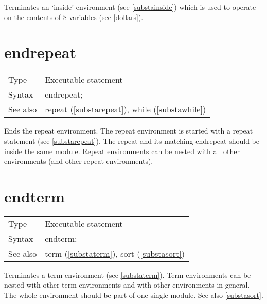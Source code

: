 \noindent Terminates an `inside' 
environment (see \ref{substainside}) which is 
used to operate on the contents of \$-variables (see 
\ref{dollars}).\vspace{10mm}


\section{endrepeat}
\label{substaendrepeat}

\noindent \begin{tabular}{ll}
Type & Executable statement\\
Syntax & endrepeat;
\\ See also & repeat (\ref{substarepeat}), while (\ref{substawhile})
\end{tabular} \vspace{4mm}

\noindent Ends the repeat 
environment. The repeat environment is started 
with a repeat statement (see \ref{substarepeat}). The repeat and its 
matching endrepeat should be inside the same module. 
Repeat environments can be nested with all other environments (and other 
repeat environments). \vspace{10mm}


\section{endterm}
\label{substaendterm}

\noindent \begin{tabular}{ll}
Type & Executable statement\\
Syntax & endterm;
\\ See also & term (\ref{substaterm}), sort (\ref{substasort})
\end{tabular} \vspace{4mm}

\noindent Terminates a term environment 
(see \ref{substaterm}). Term environments can be nested with 
other term environments and with other environments in general. The whole 
environment should be part of one single module. See also \ref{substasort}. 
\vspace{10mm}


